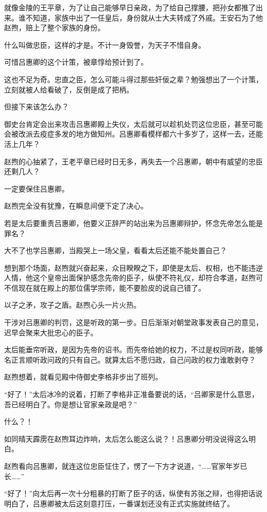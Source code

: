 就像金陵的王平章，为了让自己能够早日亲政，为了给自己撑腰，把孙女都推了出来。谁不知道，家族中出了一任皇后，身份就从士大夫转成了外戚。王安石为了他赵煦，赔上了整个家族的身份。

什么叫做忠臣，这样的才是。不计一身毁誉，为天子不惜自身。

可惜吕惠卿的这个计策，被章惇给预计到了。

这也不足为奇。忠直之臣，怎么可能斗得过那些奸佞之辈？勉强想出了一个计策，立刻就被人给看破了，反倒是成了把柄。

但接下来该怎么办？

御史台肯定会出来攻击吕惠卿殿上失仪，太后就可以趁机处罚这位忠臣，甚至可能会被改派去疫症多发的地方做知州。吕惠卿看模样都六十多岁了，这样一去，还能活上几年？

赵煦的心抽紧了，王老平章已经时日无多，再失去一个吕惠卿，朝中有威望的忠臣还剩几人？

一定要保住吕惠卿。

赵煦完全没有犹豫，在瞬息间便下定了决心。

若是太后要重责吕惠卿，他要义正辞严的站出来为吕惠卿辩护，怀念先帝怎么能是罪名？

大不了也学吕惠卿，当殿哭上一场父皇，看看太后还能不能处置自己？

想到那个场面，赵煦就兴奋起来，众目睽睽之下，即使是太后、权相，也不能违逆人情，他这个皇帝出面保护感念先帝的臣子，纵使不符礼仪，却符合孝道，赵煦可不信现在就在殿上的那位儒学宗师，能不要脸皮的说自己错了。

以子之矛，攻子之盾。赵煦心头一片火热。

干涉对吕惠卿的判罚，这是听政的第一步。日后渐渐对朝堂政事发表自己的意见，迟早会聚来大批忠心的臣子。

太后能垂帘听政，是因为先帝的诏书。而先帝给她的权力，不过是权同听政，能够名正言顺听政问政的只有自己。就算太后不愿归政，自己问政的权力谁敢剥夺？

赵煦想着，就看见殿中侍御史李格非步出了班列。

“好了！”太后冰冷的说着，打断了李格非正准备要说的话，“吕卿家是什么意思，吾已经明白了。你是想让官家亲政是吧？”

什么？！

如同晴天霹雳在赵煦耳边炸响，太后怎么能这么说？！吕惠卿分明没说得这么明白。

赵煦看向吕惠卿，就连这位忠臣怔住了，愣了一下方才说道，“……官家年岁已长……”

“好了！”向太后再一次十分粗暴的打断了臣子的话，纵使有苏张之辩，也得把话说明白了，吕惠卿被太后这刻意打压，一番谋划还没有正式实施就终结了。

